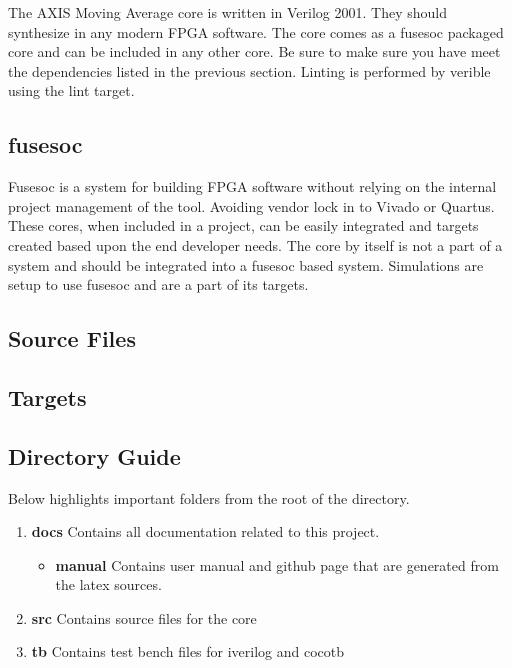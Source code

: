 \par
The AXIS Moving Average core is written in Verilog 2001. They should synthesize in any modern FPGA software. The core comes as a fusesoc packaged core and can be included in any other core. Be sure to make sure you have meet the dependencies listed in the previous section. Linting is performed by verible using the lint target.

\subsection{fusesoc}
\par
Fusesoc is a system for building FPGA software without relying on the internal project management of the tool. Avoiding vendor lock in to Vivado or Quartus.
These cores, when included in a project, can be easily integrated and targets created based upon the end developer needs. The core by itself is not a part of
a system and should be integrated into a fusesoc based system. Simulations are setup to use fusesoc and are a part of its targets.

\subsection{Source Files}



\subsection{Targets}



\subsection{Directory Guide}

\par
Below highlights important folders from the root of the directory.

\begin{enumerate}
  \item \textbf{docs} Contains all documentation related to this project.
    \begin{itemize}
      \item \textbf{manual} Contains user manual and github page that are generated from the latex sources.
    \end{itemize}
  \item \textbf{src} Contains source files for the core
  \item \textbf{tb} Contains test bench files for iverilog and cocotb
\end{enumerate}


